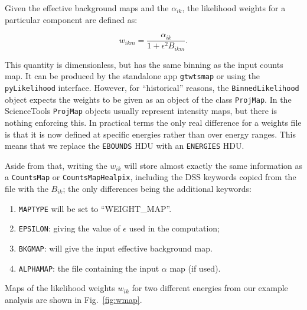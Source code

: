 \documentclass[preprint]{aastex}
\begin{document}
Given the effective background maps and the $\alpha_{ik}$, the
likelihood weights for a particular component are defined as:

\begin{equation}
w_{ikm} = \frac{\alpha_{ik}}{1 + \epsilon^2 B_{ikm}}.
\end{equation}

This quantity is dimensionless, but has the same binning as the input
counts map.  It can be produced by the standalone app {\tt gtwtsmap}
or using the {\tt pyLikelihood} interface.  However, for
``historical'' reasons, the {\tt BinnedLikelihood} object expects the
weights to be given as an object of the class {\tt ProjMap}.  In the
ScienceTools {\tt ProjMap} objects usually represent intensity maps,
but there is nothing enforcing this.  In practical terms the only real
difference for a weights file is that it is now defined at specific
energies rather than over energy ranges.  This means that we replace
the {\tt EBOUNDS} HDU with an {\tt ENERGIES} HDU.

Aside from that, writing the $w_{ik}$ will store almost exactly the
same information as a {\tt CountsMap} or {\tt CountsMapHealpix},
including the DSS keywords copied from the file with the $B_{ik}$; the
only differences being the additional keywords:

\begin{enumerate}
\item{{\tt MAPTYPE} will be set to ``WEIGHT\_MAP''.}
\item{{\tt EPSILON}: giving the value of $\epsilon$ used in the computation;}
\item{{\tt BKGMAP}: will give the input effective background map.}    
\item{{\tt ALPHAMAP}: the file containing the input $\alpha$ map (if used).}
\end{enumerate}

Maps of the likelihood weights $w_{ik}$ for two different
energies from our example analysis are shown in Fig.~\ref{fig:wmap}.
\end{document}
